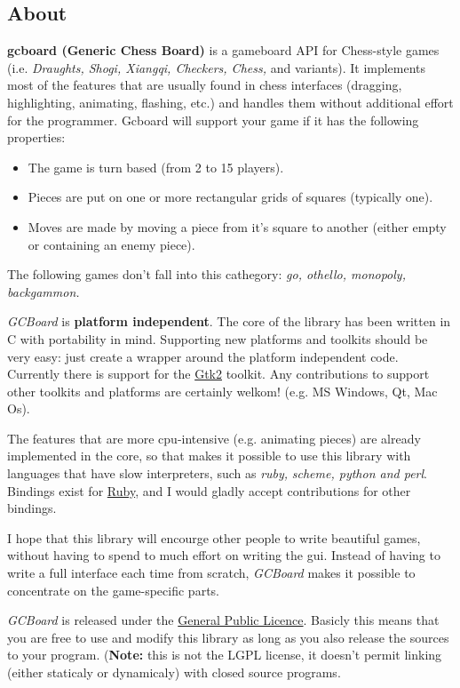 \documentclass{article}
\begin{document}
 
\hypertarget{about}{}\subsection*{{About}}\label{about}

\textbf{gcboard (Generic Chess Board)} is a gameboard API for Chess-style games (i.e. \emph{Draughts, Shogi, Xiangqi, Checkers, Chess,} and variants). It implements most of the features that are usually found in chess interfaces (dragging, highlighting, animating, flashing, etc.) and handles them without additional effort for the programmer. Gcboard will support your game if it has the following properties:

\begin{itemize}%
\item The game is turn based (from 2 to 15 players).
\item Pieces are put on one or more rectangular grids of squares (typically one).
\item Moves are made by moving a piece from it'{}s square to another (either empty or containing an enemy piece).

\end{itemize}
The following games don'{}t fall into this cathegory: \emph{go, othello, monopoly, backgammon.}

\emph{GCBoard} is \textbf{platform independent}. The core of the library has been written in C with portability in mind. Supporting new platforms and toolkits should be very easy: just create a wrapper around the platform independent code. Currently there is support for the \href{"http://www.gtk.org"}{Gtk2} toolkit. Any contributions to support other toolkits and platforms are certainly welkom! (e.g. MS Windows, Qt, Mac Os).

The features that are more cpu-intensive (e.g. animating pieces) are already implemented in the core, so that makes it possible to use this library with languages that have slow interpreters, such as \emph{ruby,} \emph{scheme, python and perl}. Bindings exist for \href{"http://www.ruby-lang.org"}{Ruby}, and I would gladly accept contributions for other bindings.

I hope that this library will encourge other people to write beautiful games, without having to spend to much effort on writing the gui. Instead of having to write a full interface each time from scratch, \emph{GCBoard} makes it possible to concentrate on the game-specific parts.

\emph{GCBoard} is released under the \href{"http://www.gnu.org/copyleft/gpl.html"}{General Public Licence}. Basicly this means that you are free to use and modify this library as long as you also release the sources to your program. (\textbf{Note:} this is not the LGPL license, it doesn'{}t permit linking (either staticaly or dynamicaly) with closed source programs.
\end{document}
